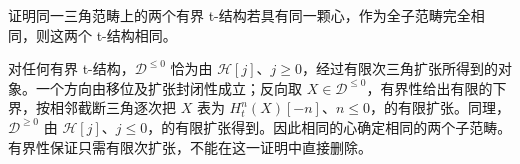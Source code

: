 \begin{exercise}\label{b4:ex:19-heart-determines-bounded-t}
	证明同一三角范畴上的两个有界 t-结构若具有同一颗心，作为全子范畴完全相同，则这两个 t-结构相同。
\end{exercise}
\begin{solution}
	对任何有界 t-结构，\(\mathcal D^{\le0}\) 恰为由 \(\mathcal H[j]\)、\(j\ge0\)，经过有限次三角扩张所得到的对象。一个方向由移位及扩张封闭性成立；反向取 \(X\in\mathcal D^{\le0}\)，有界性给出有限的下界，按相邻截断三角逐次把 \(X\) 表为 \(H_t^n(X)[-n]\)、\(n\le0\)，的有限扩张。同理，\(\mathcal D^{\ge0}\) 由 \(\mathcal H[j]\)、\(j\le0\)，的有限扩张得到。因此相同的心确定相同的两个子范畴。有界性保证只需有限次扩张，不能在这一证明中直接删除。
\end{solution}
